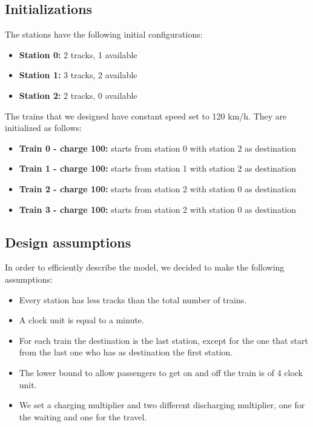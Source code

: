 \subsection{Initializations}
The stations have the following initial configurations:
\begin{itemize}
    \item \textbf{Station 0: } 2 tracks, 1 available
    \item \textbf{Station 1: } 3 tracks, 2 available
    \item \textbf{Station 2: } 2 tracks, 0 available
\end{itemize}
\newpage

The trains that we designed have constant speed set to 120 km/h. They are initialized as follows:
\begin{itemize}
    \item \textbf{Train 0 - charge 100: } starts from station 0 with station 2 as destination
    \item \textbf{Train 1 - charge 100: } starts from station 1 with station 2 as destination
    \item \textbf{Train 2 - charge 100: } starts from station 2 with station 0 as destination
    \item \textbf{Train 3 - charge 100: } starts from station 2 with station 0 as destination
\end{itemize}
\bigskip

\subsection{Design assumptions}
In order to efficiently describe the model, we decided to make the following assumptions:
\begin{itemize}
    \item Every station has less tracks than the total number of trains.
    \item A clock unit is equal to a minute.
    \item For each train the destination is the last station, except for the one that start from the last one who has
    as destination the first station.
    \item The lower bound to allow passengers to get on and off the train is of 4 clock unit.
    \item We set a charging multiplier and two different discharging multiplier, one for the waiting and one for the travel.
\end{itemize}

